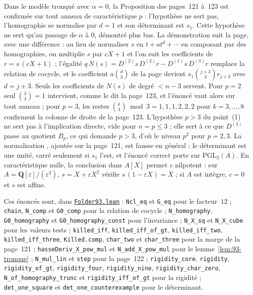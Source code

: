 \begin{remarque}
Dans le modèle tronqué avec $\alpha = 0$, la Proposition des pages~121 à~123 est confirmée sur tout anneau de caractéristique $p$ : l'hypothèse  ne sert pas, l'homographie se normalise par $d = 1$ et son déterminant est $s_1$. Cette hypothèse ne sert qu'au passage de $\alpha$ à $0$, démontré plus bas. La démonstration suit la page, avec une différence : au lieu de normaliser $s$ en $t + a t^d + \cdots$ en composant par des homographies, on multiplie $s$ par $cX + 1$ et l'on suit les coefficients de $r = s\,(cX + 1)$ ; l'égalité $q\,N(s) = D^{(2)} s\,D^{(2)} r - D^{(1)} s\,D^{(3)} r$ remplace la relation de cocycle, et le coefficient $a\binom d3$ de la page devient $s_1 \binom{j+3}3 r_{j+3}$ avec $d = j + 3$. Seuls les coefficients de $N(s)$ de degré $< n - 3$ servent. Pour $p = 2$ seul $\binom 33 = 1$ intervient, comme le dit la page~123, et l'énoncé vaut alors sur tout anneau ; pour $p = 3$, les restes $\binom k3 \bmod 3 = 1, 1, 1, 2, 2, 2$ pour $k = 3, \dots, 8$ confirment la colonne de droite de la page~123. L'hypothèse $p > 3$ du point~(1) ne sert pas à l'implication directe, vide pour $n = p \leq 3$ ; elle sert à ce que $D^{(3)}$ passe au quotient $B_p$, ce qui demande $p > 3$, d'où le niveau $p^2$ pour $p = 2, 3$. La normalisation , ajoutée sur la page~121, est fausse en général : le déterminant est une unité, carré seulement si $s_1$ l'est, et l'énoncé correct porte sur $\mathrm{PGL}_2(A)$. En caractéristique nulle, la conclusion dans $A[X]$ permet $c$ nilpotent : sur $A = \mathbf Q[\varepsilon]/(\varepsilon^2)$, $s = X + \varepsilon X^2$ vérifie $s\,(1 - \varepsilon X) = X$ ; si $A$ est intègre, $c = 0$ et $s$ est affine.
\end{remarque}

{\sloppy\noindent Ces énoncés sont, dans \href{\leanblob/AlgebraicGeometry/Folder93.lean}{\texttt{Folder93.\allowbreak{}lean}} : \texttt{Ncl\_eq} et \texttt{G\_eq} pour le facteur~$12$ ; \texttt{chain}, \texttt{N\_comp} et \texttt{G0\_comp} pour la relation de cocycle ; \texttt{N\_homography}, \texttt{G0\_homography} et \texttt{G0\_homography\_const} pour l'invariance ; \texttt{N\_X\_sq} et \texttt{N\_X\_cube} pour les valeurs tests ; \texttt{killed\_iff}, \texttt{killed\_iff\_of\_gt}, \texttt{killed\_iff\_two}, \texttt{killed\_iff\_three}, \texttt{Killed.\allowbreak{}comp}, \texttt{char\_two} et \texttt{char\_three} pour la marge de la page~121 ; \texttt{hasseDeriv\_X\_pow\_mul} et \texttt{N\_add\_X\_pow\_mul} pour le lemme~\ref{lem:93-tronque} ; \texttt{N\_mul\_lin} et \texttt{step} pour la page~122 ; \texttt{rigidity\_core}, \texttt{rigidity}, \texttt{rigidity\_of\_gt}, \texttt{rigidity\_four}, \texttt{rigidity\_nine}, \texttt{rigidity\_char\_zero}, \texttt{N\_of\_homography\_trunc} et \texttt{rigidity\_iff\_of\_gt} pour la rigidité ; \texttt{det\_one\_square} et \texttt{det\_one\_counterexample} pour le déterminant.\par}


